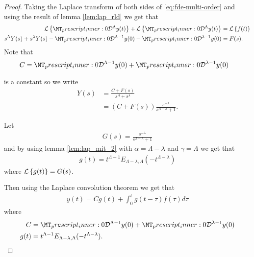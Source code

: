 \begin{proof}

	Taking the Laplace transform of both sides of \ref{eq:fde-multi-order} and using the result of lemma \ref{lem:lap_rld}
	we get that 
	\begin{align*}
		\laplace{\prescript{}{0}{\mathcal{D}}^{\Lambda}y(t)} + \laplace{\prescript{}{0}{\mathcal{D}}^{\Lambda}y(t)} &= \laplace{f(t)} \\
		s^\Lambda Y(s) + s^\lambda Y(s) - \prescript{}{0}{\mathcal{D}}^{\Lambda-1}y(0) - \prescript{}{0}{\mathcal{D}}^{\lambda-1}y(0) &= F(s).
	\end{align*}
	Note that 
	\begin{align*}
	    C &= \prescript{}{0}{\mathcal{D}}^{\Lambda-1}y(0) + \prescript{}{0}{\mathcal{D}}^{\lambda-1}y(0) 
	\end{align*}
	 
	is a constant so we write
	\begin{align*}
		Y(s) &= \frac{C + F(s)}{s^\Lambda + s^\lambda} \\
			&= \left( C + F(s)\right) \frac{s^{-\lambda}}{s^{\Lambda-\lambda} + 1}.
	\end{align*}
	
	Let 
	\begin{align*} 
	    G(s) = \frac{s^{-\lambda}}{s^{\Lambda-\lambda} + 1} 
	\end{align*}
	and by using lemma \ref{lem:lap_mit_2} with $ \alpha = \Lambda - \lambda $ and $ \gamma = \Lambda $
	we get that 
	\begin{align*}
	    g(t) = t^{\Lambda  -1}E_{\Lambda - \lambda, \Lambda}(-t^{\Lambda - \lambda})
	\end{align*} where $ \mathcal{L} \left\{ g(t) \right\} = G(s) $.
	
	Then using the Laplace convolution theorem we get that 
	\begin{align*}
		y(t) = C g(t) + \int_0^t g(t-\tau)f(\tau) d\tau
	\end{align*}
	where
	\begin{align*}
		C &= \prescript{}{0}{\mathcal{D}}^{\Lambda-1}y(0) + \prescript{}{0}{\mathcal{D}}^{\lambda-1}y(0)  \\
		g(t) &= t^{\Lambda - 1} E_{\Lambda - \lambda, \Lambda}(-t^{\Lambda - \lambda}).
	\end{align*}
\end{proof}

